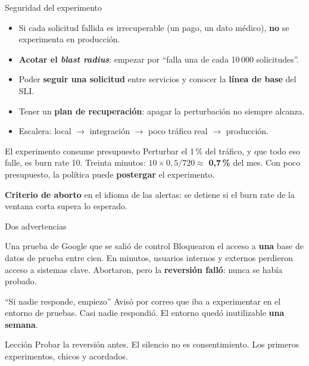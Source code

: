 \documentclass[institutional,screen,none]{ua-engineering-v6-beamer}
\begin{document}
\begin{frame}{Seguridad del experimento}
\begin{itemize}\small
\item Si cada solicitud fallida es irrecuperable (un pago, un dato médico), \textbf{no} se experimenta en producción.
\item \textbf{Acotar el \emph{blast radius}}: empezar por ``falla una de cada 10\,000 solicitudes''.
\item Poder \textbf{seguir una solicitud} entre servicios y conocer la \textbf{línea de base} del SLI.
\item Tener un \textbf{plan de recuperación}: apagar la perturbación no siempre alcanza.
\item Escalera: local $\to$ integración $\to$ poco tráfico real $\to$ producción.
\end{itemize}

\pause

\begin{block}{El experimento consume presupuesto}
Perturbar el 1\,\% del tráfico, y que todo eso falle, es burn rate 10. Treinta minutos: $10 \times 0{,}5 / 720 \approx$ \textbf{0,7\,\%} del mes. Con poco presupuesto, la política puede \textbf{postergar} el experimento.
\end{block}

{\small \textbf{Criterio de aborto} en el idioma de las alertas: se detiene si el burn rate de la ventana corta supera lo esperado.}
\end{frame}

\begin{frame}{Dos advertencias}
\begin{block}{Una prueba de Google que se salió de control}
Bloquearon el acceso a \textbf{una} base de datos de prueba entre cien. En minutos, usuarios internos y externos perdieron acceso a sistemas clave. Abortaron, pero la \textbf{reversión falló}: nunca se había probado.
\end{block}

\pause

\begin{block}{``Si nadie responde, empiezo''}
Avisó por correo que iba a experimentar en el entorno de pruebas. Casi nadie respondió. El entorno quedó inutilizable \textbf{una semana}.
\end{block}

\pause

\begin{alertblock}{Lección}
Probar la reversión antes. El silencio no es consentimiento. Los primeros experimentos, chicos y acordados.
\end{alertblock}
\end{frame}
\end{document}
